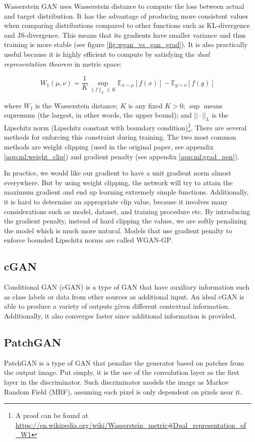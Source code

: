 Wasserstein GAN uses Wasserstein distance to compute the loss between actual and target distribution. It has the advantage of producing more consistent values when comparing distributions compared to other functions such as KL-divergence and JS-divergence. This means that its gradients have smaller variance and thus training is more stable (see figure \ref{fig:wgan_vs_gan_grad}). It is also practically useful because it is highly efficient to compute by satisfying the \textit{dual representation theorem} in metric space:

$$
W_{1}(\mu, \nu)=\frac{1}{K} \sup _{\|f\|_{L} \leq K} \mathbb{E}_{x \sim \mu}[f(x)]-\mathbb{E}_{y \sim \nu}[f(y)]
$$

where $W_1$ is the Wasserstein distance; $K$ is any fixed $K > 0$; $\sup$ means supremum (the largest, in other words, the upper bound); and $||\cdot||_L$ is the Lipschitz norm (Lipschitz constant with boundary condition)\footnote{A proof can be found at \url{https://en.wikipedia.org/wiki/Wasserstein\_metric\#Dual\_representation\_of\_W1}}. There are several methods for enforcing this constraint during training. The two most common methods are weight clipping (used in the original paper, see appendix \ref{app:ml:weight_clip}) and gradient penalty (see appendix \ref{app:ml:grad_pen}).

In practice, we would like our gradient to have a unit gradient norm almost everywhere. But by using weight clipping, the network will try to attain the maximum gradient and end up learning extremely simple functions\cite{gulrajaniImprovedTrainingWasserstein2017}. Additionally, it is hard to determine an appropriate clip value, because it involves many considerations such as model, dataset, and training procedure etc. By introducing the gradient penalty, instead of hard clipping the values, we are softly penalizing the model which is much more natural. Models that use gradient penalty to enforce bounded Lipschitz norms are called WGAN-GP.

\subsection{cGAN}
Conditional GAN (cGAN) is a type of GAN that have auxiliary information such as class labels or data from other sources as additional input. An ideal cGAN is able to produce a variety of outputs given different contextual information. Additionally, it also converges faster since additional information is provided.


\subsection{PatchGAN}
PatchGAN is a type of GAN that penalize the generator based on patches from the output image. Put simply, it is the use of the convolution layer as the first layer in the discriminator. Such discriminator models the image as Markov Random Field (MRF), assuming each pixel is only dependent on pixels near it.


